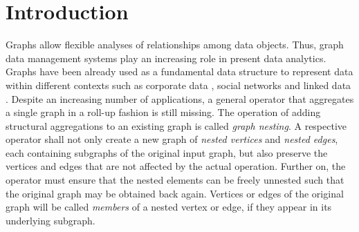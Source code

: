 
\section{Introduction}
Graphs allow flexible analyses of relationships among data objects. Thus, graph data management systems play an increasing role in present data analytics. Graphs have been already used as a fundamental data structure to represent data within different contexts such as corporate data \cite{success,Park2016355}, social networks \cite{xie,BrodkaK14} and linked data \cite{Vasilyeva13}.
Despite an increasing number of applications, a general operator that aggregates a single graph in a roll-up fashion is still missing. %
 The operation of adding structural aggregations to an existing graph is called \textit{graph nesting}.
A respective operator shall not only create a new graph of \textit{nested vertices} and \textit{nested edges}, each containing subgraphs of the original input graph, but also preserve the vertices and edges that are not affected by the actual operation. Further on, the operator must ensure that the nested elements can be freely unnested such that the original graph may be obtained back again. Vertices or edges of the original graph will be called \textit{members} of a nested vertex or edge, if they appear in its underlying subgraph.

